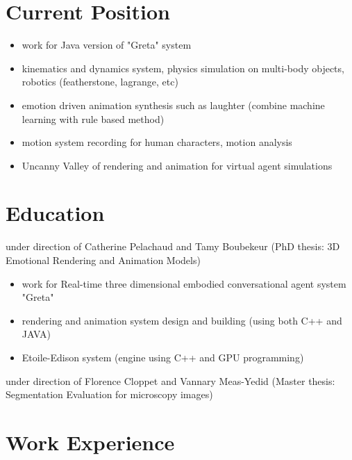 \section{Current Position}
{
\begin{itemize}
	\item work for Java version of "Greta" system
	\item kinematics and dynamics system, physics simulation on multi-body objects, robotics (featherstone, lagrange, etc)
	\item emotion driven animation synthesis such as laughter (combine machine learning with rule based method)
	\item motion system recording for human characters, motion analysis
	\item Uncanny Valley of rendering and animation for virtual agent simulations
\end{itemize}
}


\section{Education}
{under direction of Catherine Pelachaud and Tamy Boubekeur (PhD thesis: 3D Emotional Rendering and Animation Models)
\begin{itemize}
	\item work for Real-time three dimensional embodied conversational agent system "Greta"
	\item rendering and animation system design and building (using both C++ and JAVA)
	\item Etoile-Edison system (engine using C++ and GPU programming)
\end{itemize}
}  %

{under direction of Florence Cloppet and Vannary Meas-Yedid (Master thesis: Segmentation Evaluation for microscopy images)
}


\section{Work Experience}


